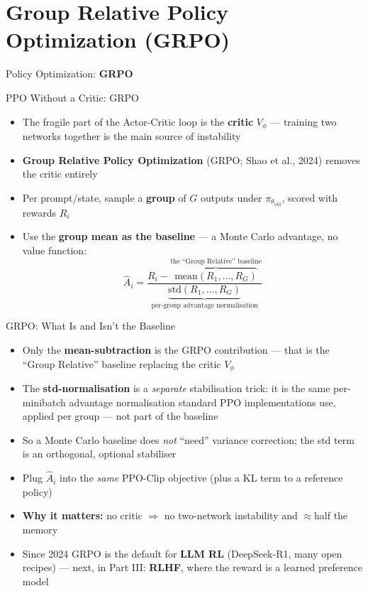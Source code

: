 \section{Group Relative Policy Optimization (GRPO)}
\begin{frame}{}
    \LARGE Policy Optimization: \textbf{GRPO}
\end{frame}

\begin{frame}{PPO Without a Critic: GRPO}
\begin{itemize}
    \item The fragile part of the Actor-Critic loop is the \textbf{critic} $V_\phi$ --- training two networks together is the main source of instability
    \item \textbf{Group Relative Policy Optimization} (GRPO; Shao et al., 2024) removes the critic entirely
    \pause
    \item Per prompt/state, sample a \textbf{group} of $G$ outputs under $\pi_{\theta_\text{old}}$, scored with rewards $R_i$
    \item Use the \textbf{group mean as the baseline} --- a Monte Carlo advantage, no value function:
    $$\hat{A}_i = \frac{R_i - \overbrace{\mathrm{mean}(R_1,\dots,R_G)}^{\text{the ``Group Relative'' baseline}}}{\underbrace{\mathrm{std}(R_1,\dots,R_G)}_{\text{per-group advantage normalisation}}}$$
\end{itemize}
\end{frame}

\begin{frame}{GRPO: What Is and Isn't the Baseline}
\begin{itemize}
    \item Only the \textbf{mean-subtraction} is the GRPO contribution --- that is the ``Group Relative'' baseline replacing the critic $V_\phi$
    \item The \textbf{std-normalisation} is a \emph{separate} stabilisation trick: it is the same per-minibatch advantage normalisation standard PPO implementations use, applied per group --- not part of the baseline
    \item So a Monte Carlo baseline does \emph{not} ``need'' variance correction; the std term is an orthogonal, optional stabiliser
    \pause
    \item Plug $\hat{A}_i$ into the \emph{same} PPO-Clip objective (plus a KL term to a reference policy)
    \item \textbf{Why it matters:} no critic $\Rightarrow$ no two-network instability and $\approx$half the memory
    \item Since 2024 GRPO is the default for \textbf{LLM RL} (DeepSeek-R1, many open recipes) --- next, in Part III: \textbf{RLHF}, where the reward is a learned preference model
\end{itemize}
\end{frame}

